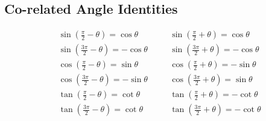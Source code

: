 \documentclass{article}
\begin{document}
\subsection*{Co-related Angle Identities}
\begin{align*}
&\sin \left(\frac{\pi}{2} - \theta\right) = \cos \theta \quad
&&\sin \left(\frac{\pi}{2} + \theta\right) = \cos \theta \\
&\sin \left(\frac{3\pi}{2} - \theta\right) = -\cos \theta \quad
&&\sin \left(\frac{3\pi}{2} + \theta\right) = -\cos \theta \\
&\cos \left(\frac{\pi}{2} - \theta\right) = \sin \theta \quad
&&\cos \left(\frac{\pi}{2} + \theta\right) = -\sin \theta \\
&\cos \left(\frac{3\pi}{2} - \theta\right) = -\sin \theta \quad
&&\cos \left(\frac{3\pi}{2} + \theta\right) = \sin \theta \\
&\tan \left(\frac{\pi}{2} - \theta\right) = \cot \theta \quad
&&\tan \left(\frac{\pi}{2} + \theta\right) = -\cot \theta \\
&\tan \left(\frac{3\pi}{2} - \theta\right) = \cot \theta \quad
&&\tan \left(\frac{3\pi}{2} + \theta\right) = -\cot \theta
\end{align*}


\newpage 
\end{document}
